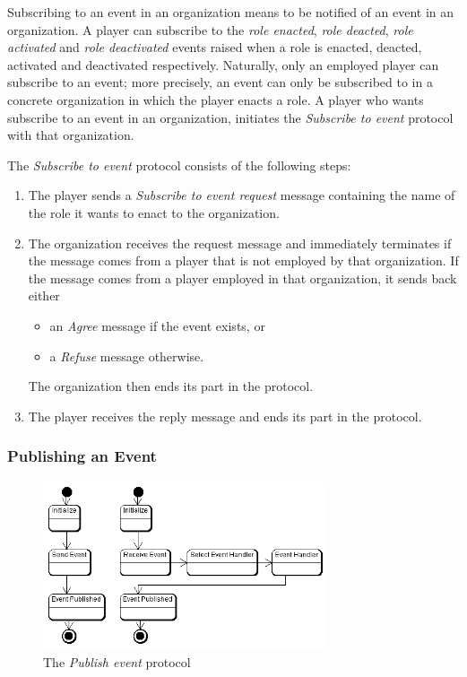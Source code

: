 Subscribing to an event in an organization means to be notified of an event in an organization.
A player can subscribe to the \textit{role enacted}, \textit{role deacted}, \textit{role activated} and \textit{role deactivated} events raised when a role is enacted, deacted, activated and deactivated respectively.
Naturally, only an employed player can subscribe to an event; more precisely, an event can only be subscribed to in a concrete organization in which the player enacts a role.
A player who wants subscribe to an event in an organization, initiates the \textit{Subscribe to event} protocol with that organization.

The \textit{Subscribe to event} protocol consists of the following steps:
\begin{enumerate}
	\item The player sends a \textit{Subscribe to event request} message containing the name of the role it wants to enact to the organization.
	\item The organization receives the request message and immediately terminates if the message comes from a player that is not employed by that organization.
	If the message comes from a player employed in that organization, it sends back either
	\begin{itemize}
		\item an \textit{Agree} message if the event exists, or
		\item a \textit{Refuse} message otherwise. 
	\end{itemize}
	The organization then ends its part in the protocol.
	\item The player receives the reply message and ends its part in the protocol.
\end{enumerate}

\subsubsection{Publishing an Event}

\begin{figure}[ht]
	\centering
	\includegraphics[width=0.75\textwidth]{images/thespian/publish-event-protocol.png}
	\caption{The \textit{Publish event} protocol}
	\label{figure:thespian-publish-event-protocol}
\end{figure}

